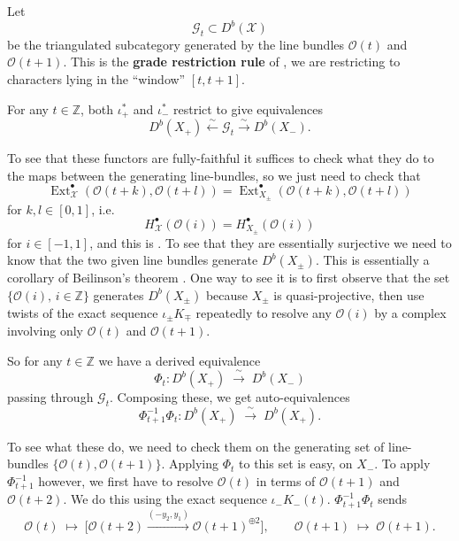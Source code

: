 \documentclass[12pt]{article}
\begin{document}
Let
\[
\mathcal{G}_t \subset D^b(\mathcal{X})
\]
be the triangulated subcategory generated by the line bundles 
$\mathcal{O}(t)$ and $\mathcal{O}(t+1)$. This is the \textbf{grade restriction rule} of \cite{ref}, 
we are restricting to characters lying in the “window” $[t,t+1]$.

\begin{claim}
For any $t \in \mathbb{Z}$, both $\iota_+^*$ and $\iota_-^*$ restrict to give equivalences
\[
D^b(X_+) \xleftarrow{\sim} \mathcal{G}_t \xrightarrow{\sim} D^b(X_-).
\]
\end{claim}

To see that these functors are fully-faithful it suffices to check what they do to the maps 
between the generating line-bundles, so we just need to check that
\[
\operatorname{Ext}^\bullet_{\mathcal{X}}(\mathcal{O}(t+k),\mathcal{O}(t+l))
= \operatorname{Ext}^\bullet_{X_\pm}(\mathcal{O}(t+k),\mathcal{O}(t+l))
\]
for $k,l \in [0,1]$, i.e.
\[
H^\bullet_{\mathcal{X}}(\mathcal{O}(i)) = H^\bullet_{X_\pm}(\mathcal{O}(i))
\]
for $i \in [-1,1]$, and this is . To see that they are essentially surjective we need 
to know that the two given line bundles generate $D^b(X_\pm)$. This is essentially a corollary of Beilinson's theorem \cite{beilinson}. One way to see it is to first observe that the set $\{\mathcal{O}(i),\, i\in \mathbb{Z}\}$ generates $D^b(X_\pm)$ because $X_\pm$ is quasi-projective, 
then use twists of the exact sequence $\iota_\pm K_\mp$ repeatedly to resolve any $\mathcal{O}(i)$ 
by a complex involving only $\mathcal{O}(t)$ and $\mathcal{O}(t+1)$.

So for any $t\in\mathbb{Z}$ we have a derived equivalence
\[
\Phi_t : D^b(X_+) \;\xrightarrow{\ \sim\ }\; D^b(X_-)
\]
passing through $\mathcal{G}_t$. Composing these, we get auto-equivalences
\[
\Phi_{t+1}^{-1}\Phi_t : D^b(X_+) \;\xrightarrow{\ \sim\ }\; D^b(X_+).
\]

To see what these do, we need to check them on the generating set of line-bundles 
$\{\mathcal{O}(t), \mathcal{O}(t+1)\}$. Applying $\Phi_t$ to this set is easy,  on $X_-$. To apply $\Phi_{t+1}^{-1}$ however, we first have to resolve 
$\mathcal{O}(t)$ in terms of $\mathcal{O}(t+1)$ and $\mathcal{O}(t+2)$. We do this using the 
exact sequence $\iota_-K_{-}(t)$. $\Phi_{t+1}^{-1}\Phi_t$ sends
\[
\mathcal{O}(t) \;\mapsto\; 
\big[ \mathcal{O}(t+2) \xrightarrow{(-y_2,y_1)} \mathcal{O}(t+1)^{\oplus 2} \big], 
\qquad
\mathcal{O}(t+1) \;\mapsto\; \mathcal{O}(t+1).
\]
\end{document}
